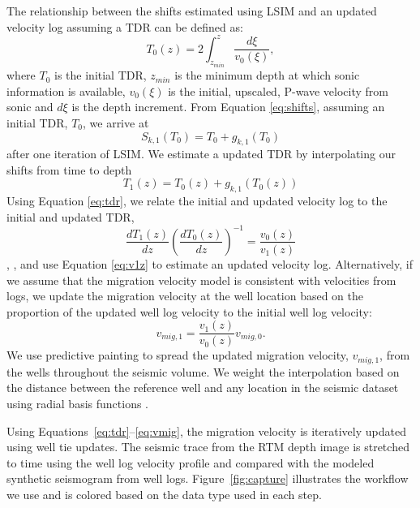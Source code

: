The relationship between the shifts estimated using LSIM and an updated velocity log assuming a TDR can be defined as:
\begin{equation} \label{eq:tdr}
T_0(z) = 2 \int_{z_{min}}^{z} \frac{d\xi}{v_0(\xi)},
\end{equation}
where $T_0$ is the initial TDR, $z_{min}$ is the minimum depth at which sonic information is available, $v_0(\xi)$ is the initial, upscaled, P-wave velocity from sonic and $d\xi$ is the depth increment.
From Equation \ref{eq:shifts}, assuming an initial TDR, $T_0$, we arrive at
\begin{equation} \label{eq:break}
S_{k,1}(T_0) = T_0 + g_{k,1}(T_0)
\end{equation}
after one iteration of LSIM. We estimate a updated TDR by interpolating our shifts from time to depth
\begin{equation} \label{eq:newtdr}
T_1(z) = T_0(z) + g_{k,1}(T_0(z))
\end{equation}
Using Equation \ref{eq:tdr}, we relate the initial and updated velocity log to the initial and updated TDR,
\begin{equation} \label{eq:v1z}
\frac{dT_1(z)}{dz}(\frac{dT_0(z)}{dz})^{-1} = \frac{v_0(z)}{v_1(z)}
\end{equation}
\cite{munoz2015automatic}, \cite{herrerab}, and \cite{bader2018interp} use Equation \ref{eq:v1z} to estimate an updated velocity log. Alternatively, if we assume that the migration velocity model is consistent with velocities from logs, we update the migration velocity at the well location based on the proportion of the updated well log velocity to the initial well log velocity:
\begin{equation} \label{eq:vmig}
v_{mig,1} = \frac{v_1(z)}{v_0(z)}v_{mig,0}.
\end{equation}
We use predictive painting \cite[]{fomel2010predictive} to spread the updated migration velocity, $v_{mig,1}$, from the wells throughout the seismic volume. We weight the interpolation based on the distance between the reference well and any location in the seismic dataset using radial basis functions \cite[]{karimi2017creating}.

Using Equations~\ref{eq:tdr}--\ref{eq:vmig}, the migration velocity is iteratively updated using well tie updates. The seismic trace from the RTM depth image is stretched to time using the well log velocity profile and compared with the modeled synthetic seismogram from well logs. Figure~\ref{fig:capture} illustrates the workflow we use and is colored based on the data type used in each step.


